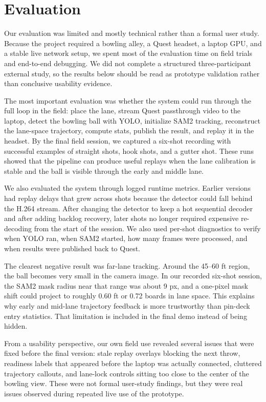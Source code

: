 \documentclass[11pt]{article}
\begin{document}
\section{Evaluation}

Our evaluation was limited and mostly technical rather than a formal user study. Because the project required a bowling alley, a Quest headset, a laptop GPU, and a stable live network setup, we spent most of the evaluation time on field trials and end-to-end debugging. We did not complete a structured three-participant external study, so the results below should be read as prototype validation rather than conclusive usability evidence.

The most important evaluation was whether the system could run through the full loop in the field: place the lane, stream Quest passthrough video to the laptop, detect the bowling ball with YOLO, initialize SAM2 tracking, reconstruct the lane-space trajectory, compute stats, publish the result, and replay it in the headset. By the final field session, we captured a six-shot recording with successful examples of straight shots, hook shots, and a gutter shot. These runs showed that the pipeline can produce useful replays when the lane calibration is stable and the ball is visible through the early and middle lane.

We also evaluated the system through logged runtime metrics. Earlier versions had replay delays that grew across shots because the detector could fall behind the H.264 stream. After changing the detector to keep a hot sequential decoder and after adding backlog recovery, later shots no longer required expensive re-decoding from the start of the session. We also used per-shot diagnostics to verify when YOLO ran, when SAM2 started, how many frames were processed, and when results were published back to Quest.

The clearest negative result was far-lane tracking. Around the 45--60 ft region, the ball becomes very small in the camera image. In our recorded six-shot session, the SAM2 mask radius near that range was about 9 px, and a one-pixel mask shift could project to roughly 0.60 ft or 0.72 boards in lane space. This explains why early and mid-lane trajectory feedback is more trustworthy than pin-deck entry statistics. That limitation is included in the final demo instead of being hidden.

From a usability perspective, our own field use revealed several issues that were fixed before the final version: stale replay overlays blocking the next throw, readiness labels that appeared before the laptop was actually connected, cluttered trajectory callouts, and lane-lock controls sitting too close to the center of the bowling view. These were not formal user-study findings, but they were real issues observed during repeated live use of the prototype.
\end{document}
